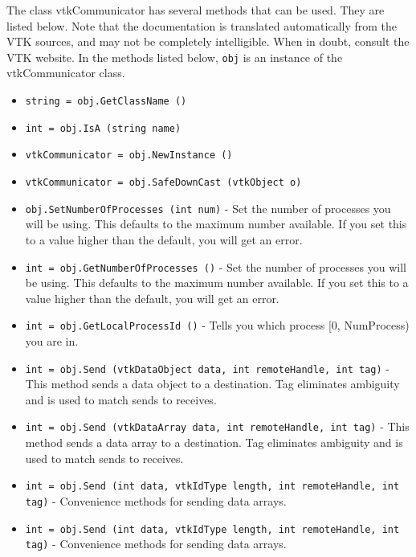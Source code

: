 The class vtkCommunicator has several methods that can be used.
  They are listed below.
Note that the documentation is translated automatically from the VTK sources,
and may not be completely intelligible.  When in doubt, consult the VTK website.
In the methods listed below, \verb|obj| is an instance of the vtkCommunicator class.
\begin{itemize}
\item  \verb|string = obj.GetClassName ()|

\item  \verb|int = obj.IsA (string name)|

\item  \verb|vtkCommunicator = obj.NewInstance ()|

\item  \verb|vtkCommunicator = obj.SafeDownCast (vtkObject o)|

\item  \verb|obj.SetNumberOfProcesses (int num)| -  Set the number of processes you will be using.  This defaults
 to the maximum number available.  If you set this to a value
 higher than the default, you will get an error.

\item  \verb|int = obj.GetNumberOfProcesses ()| -  Set the number of processes you will be using.  This defaults
 to the maximum number available.  If you set this to a value
 higher than the default, you will get an error.

\item  \verb|int = obj.GetLocalProcessId ()| -  Tells you which process [0, NumProcess) you are in.

\item  \verb|int = obj.Send (vtkDataObject data, int remoteHandle, int tag)| -  This method sends a data object to a destination.
 Tag eliminates ambiguity
 and is used to match sends to receives.

\item  \verb|int = obj.Send (vtkDataArray data, int remoteHandle, int tag)| -  This method sends a data array to a destination.
 Tag eliminates ambiguity
 and is used to match sends to receives.

\item  \verb|int = obj.Send (int data, vtkIdType length, int remoteHandle, int tag)| -  Convenience methods for sending data arrays.

\item  \verb|int = obj.Send (int data, vtkIdType length, int remoteHandle, int tag)| -  Convenience methods for sending data arrays.


\end{itemize}
